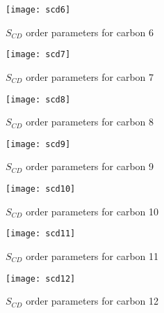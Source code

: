 \documentclass[doublespacing]{elsart}
\begin{document}
\begin{figure}[p]
\begin{center}
\texttt{[image: scd6]}
\end{center}
\caption{$S_{CD}$ order parameters for carbon 6}
\label{fig:scd6}
\end{figure}

\begin{figure}[p]
\begin{center}
\texttt{[image: scd7]}
\end{center}
\caption{$S_{CD}$ order parameters for carbon 7}
\label{fig:scd7}
\end{figure}


\begin{figure}[p]
\begin{center}
\texttt{[image: scd8]}
\end{center}
\caption{$S_{CD}$ order parameters for carbon 8}
\label{fig:scd8}
\end{figure}

\begin{figure}[p]
\begin{center}
\texttt{[image: scd9]}
\end{center}
\caption{$S_{CD}$ order parameters for carbon 9}
\label{fig:scd9}
\end{figure}

\begin{figure}[p]
\begin{center}
\texttt{[image: scd10]}
\end{center}
\caption{$S_{CD}$ order parameters for carbon 10}
\label{fig:scd10}
\end{figure}

\begin{figure}[p]
\begin{center}
\texttt{[image: scd11]}
\end{center}
\caption{$S_{CD}$ order parameters for carbon 11}
\label{fig:scd11}
\end{figure}

\begin{figure}[p]
\begin{center}
\texttt{[image: scd12]}
\end{center}
\caption{$S_{CD}$ order parameters for carbon 12}
\label{fig:scd12}
\end{figure}
\end{document}
